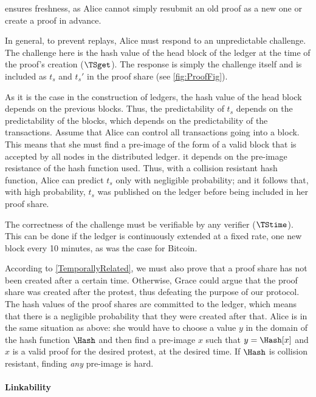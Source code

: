  ensures freshness, as Alice cannot simply resubmit an 
old proof as a new one or create a proof in advance.

In general, to prevent replays, Alice must respond to an unpredictable 
challenge.
The challenge here is the hash value of the head block of the ledger at the 
time of the proof's creation (\(\TSget\)).
The response is simply the challenge itself and is included as \(t_s\) and 
\(t_s'\) in the proof share (see \cref{fig:ProofFig}).

As it is the case in the construction of ledgers, the hash value of the head 
block depends on the previous blocks.
Thus, the predictability of \(t_s\) depends on the predictability of the 
blocks, which depends on the predictability of the transactions.
Assume that Alice can control all transactions going into a block.
This means that she must find a pre-image of the form of a valid block that is 
accepted by all nodes in the distributed ledger.
\Ie it depends on the pre-image resistance of the hash function used.
Thus, with a collision resistant hash function, Alice can predict \(t_s\) only 
with negligible probability; and it follows that, with high probability, 
\(t_s\) was published on the ledger before being included in her proof share.

The correctness of the challenge must be verifiable by any verifier 
(\(\TStime\)).
This can be done if the ledger is continuously extended at a fixed rate, \eg 
one new block every 10 minutes, as was the case for Bitcoin.

According to \cref{TemporallyRelated}, we must also prove that a proof share has not been created after a certain time.
Otherwise, Grace could argue that the proof share was created after the protest, thus defeating the purpose of our protocol.
The hash values of the proof shares are committed to the ledger, which means 
that there is a negligible probability that they were created after that.
Alice is in the same situation as above:
she would have to choose a value \(y\) in the domain of the hash function 
\(\Hash\) and then find a pre-image \(x\) such that \(y = \Hash[x]\) and \(x\) 
is a valid proof for the desired protest, at the desired time.
If \(\Hash\) is collision resistant, finding \emph{any} pre-image is hard.

\paragraph{Linkability}%
\label{analysis-linkability}

